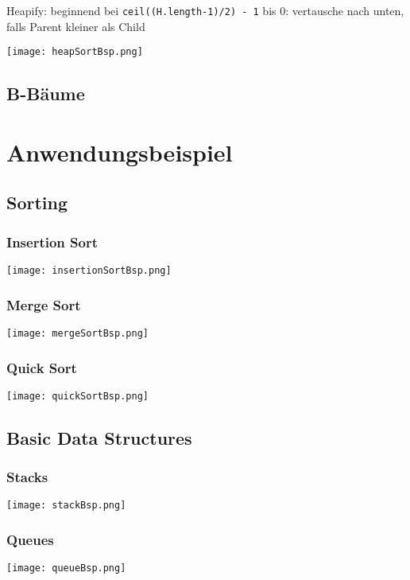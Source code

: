 \noindent
Heapify: beginnend bei \texttt{ceil((H.length-1)/2) - 1} bis 0: vertausche nach unten, falls Parent kleiner als Child
\centerline{\texttt{[image: heapSortBsp.png]}}

\subsection*{B-Bäume}

\pagebreak

\section*{Anwendungsbeispiel}

\subsection*{Sorting}

\subsubsection*{Insertion Sort}
\centerline{\texttt{[image: insertionSortBsp.png]}}

\subsubsection*{Merge Sort}
\centerline{\texttt{[image: mergeSortBsp.png]}}

\subsubsection*{Quick Sort}
\centerline{\texttt{[image: quickSortBsp.png]}}

\subsection*{Basic Data Structures}

\subsubsection*{Stacks}
\centerline{\texttt{[image: stackBsp.png]}}

\subsubsection*{Queues}
\centerline{\texttt{[image: queueBsp.png]}}

